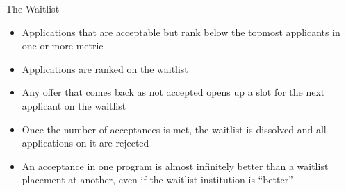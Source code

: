 \begin{frame}[fragile]{The Waitlist}
\begin{itemize}
    \item Applications that are acceptable but rank below the topmost applicants in one or more metric
    \item Applications are ranked on the waitlist
    \item Any offer that comes back as not accepted opens up a slot for the next applicant on the waitlist
    \item Once the number of acceptances is met, the waitlist is dissolved and all applications on it are rejected
    \item An acceptance in one program is almost infinitely better than a waitlist placement at another, even if the waitlist institution is ``better''
\end{itemize}
\end{frame}

